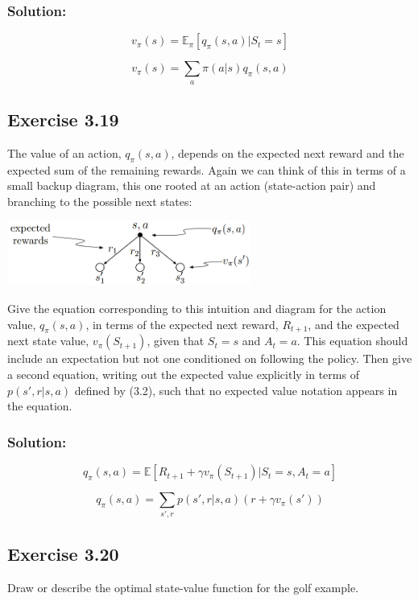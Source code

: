 \subsubsection*{Solution:}

\[
    v_\pi(s)= \mathbb{E}_{\pi} \left[q_\pi(s,a) | S_t = s \right]
\]

\[
    v_\pi(s)= \sum_a \pi(a|s) q_\pi(s,a)
\]

\subsection*{Exercise 3.19} The value of an action, $q_\pi(s,a)$, depends on the expected next reward and
the expected sum of the remaining rewards. Again we can think of this in terms of a
small backup diagram, this one rooted at an action (state-action pair) and branching to
the possible next states:

\begin{center}
    \includegraphics[width=0.6\textwidth]{chapters_latex/figures/ex_03_19.png}
\end{center}

Give the equation corresponding to this intuition and diagram for the action value,
$q_\pi(s,a)$, in terms of the expected next reward, $R_{t+1}$, and the expected next state value,
$v_\pi(S_{t+1})$, given that $S_t = s$ and $A_t = a$. This equation should include an expectation but
not one conditioned on following the policy. Then give a second equation, writing out the
expected value explicitly in terms of $p(s',r|s,a)$ defined by (3.2), such that no expected
value notation appears in the equation. 

\subsubsection*{Solution:}

\[
    q_\pi(s, a)= \mathbb{E} \left[R_{t+1} + \gamma v_\pi(S_{t+1}) | S_t = s, A_t = a \right]
\]

\[
    q_\pi(s, a)= \sum_{s',r} p(s',r|s,a) \left( r + \gamma v_\pi(s') \right)
\]


\subsection*{Exercise 3.20}
Draw or describe the optimal state-value function for the golf example.

